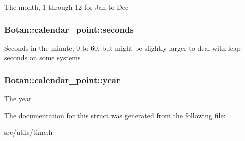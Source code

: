 The month, 1 through 12 for Jan to Dec \hypertarget{structBotan_1_1calendar__point_a5977fb8032381d23e1eab589c72e3d22}{
\subsubsection[{seconds}]{ Botan\-::calendar\-\_\-point\-::seconds}}\label{structBotan_1_1calendar__point_a5977fb8032381d23e1eab589c72e3d22}
Seconds in the minute, 0 to 60, but might be slightly larger to deal with leap seconds on some systems \hypertarget{structBotan_1_1calendar__point_a76a738149369b76116d30eebf2ca0fec}{
\subsubsection[{year}]{ Botan\-::calendar\-\_\-point\-::year}}\label{structBotan_1_1calendar__point_a76a738149369b76116d30eebf2ca0fec}
The year 

The documentation for this struct was generated from the following file\-:\begin{DoxyCompactItemize}
\item 
src/utils/time.\-h\end{DoxyCompactItemize}
